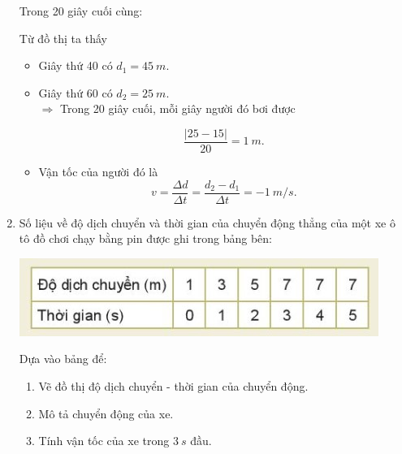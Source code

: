\begin{enumerate}[label=\bfseries Bài \arabic*:,leftmargin=1.5cm]
{\begin{enumerate}[label=\alph*)]
			Trong 20 giây cuối cùng:
			
			Từ đồ thị ta thấy
			\begin{itemize}
				\item Giây thứ 40 có $d_1 = \SI{45}{m}$.
				\item Giây thứ 60 có $d_2 =  \SI{25}{m}$.\\
				$\Rightarrow$ Trong 20 giây cuối, mỗi giây người đó bơi được 
				
				$$\dfrac{|25 - 15|}{20} = \SI{1}{m}.$$
				\item Vận tốc của người đó là
					$$v = \dfrac{\Delta d}{\Delta t} = \dfrac{d_2 - d_1}{\Delta t} = -\SI{1}{m/s}.$$
			\end{itemize}
		\end{enumerate}		
	}
	
	\item {}
	
	{
		Số liệu về độ dịch chuyển và thời gian của chuyển động thẳng của một xe ô tô đồ chơi chạy bằng pin được ghi trong bảng bên: 
		\begin{center}
			\includegraphics[scale=1]{../figs/VN10-2022-PH-TP006-3.jpg}
		\end{center}
		
		Dựa vào bảng để:
		
		\begin{enumerate}[label=\alph*)]
			\item Vẽ đồ thị độ dịch chuyển - thời gian của chuyển động.
			\item Mô tả chuyển động của xe.
			\item Tính vận tốc của xe trong $\SI{3}{s}$ đầu.
		\end{enumerate}
	}
\end{enumerate}
